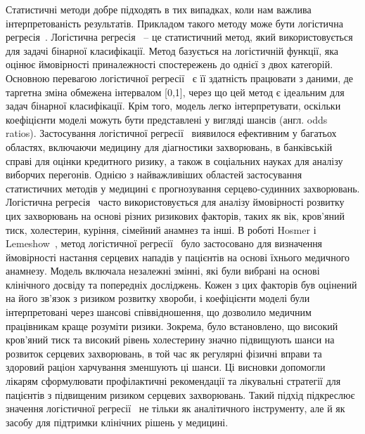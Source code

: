 Статистичні методи добре підходять в тих випадках, коли нам важлива інтерпретованість результатів. Прикладом такого методу може бути логістична регресія~\cite{ct1}. Логістична регресія~\cite{ct1} -- це статистичний метод, який використовується для задачі бінарної класифікації. Метод базується на логістичній функції, яка оцінює ймовірності приналежності спостережень до однієї з двох категорій. Основною перевагою логістичної регресії~\cite{ct1} є її здатність працювати з даними, де таргетна зміна обмежена інтервалом [0,1], через що цей метод є ідеальним для задач бінарної класифікації. Крім того, модель легко інтерпретувати, оскільки коефіцієнти моделі можуть бути представлені у вигляді шансів (англ. odds ratios). Застосування логістичної регресії~\cite{ct1} виявилося ефективним у багатьох областях, включаючи медицину для діагностики захворювань, в банківській справі для оцінки кредитного ризику, а також в соціальних науках для аналізу виборчих перегонів. Однією з найважливіших областей застосування статистичних методів у медицині є прогнозування серцево-судинних захворювань. Логістична регресія~\cite{ct1} часто використовується для аналізу ймовірності розвитку цих захворювань на основі різних ризикових факторів, таких як вік, кров'яний тиск, холестерин, куріння, сімейний анамнез та інші. В роботі Hosmer і Lemeshow~\cite{ct12}, метод логістичної регресії~\cite{ct1} було застосовано для визначення ймовірності настання серцевих нападів у пацієнтів на основі їхнього медичного анамнезу. Модель включала незалежні змінні, які були вибрані на основі клінічного досвіду та попередніх досліджень. Кожен з цих факторів був оцінений на його зв'язок з ризиком розвитку хвороби, і коефіцієнти моделі були інтерпретовані через шансові співвідношення, що дозволило медичним працівникам краще розуміти ризики. Зокрема, було встановлено, що високий кров'яний тиск та високий рівень холестерину значно підвищують шанси на розвиток серцевих захворювань, в той час як регулярні фізичні вправи та здоровий раціон харчування зменшують ці шанси. Ці висновки допомогли лікарям сформулювати профілактичні рекомендації та лікувальні стратегії для пацієнтів з підвищеним ризиком серцевих захворювань. Такий підхід підкреслює значення логістичної регресії~\cite{ct1} не тільки як аналітичного інструменту, але й як засобу для підтримки клінічних рішень у медицині.

